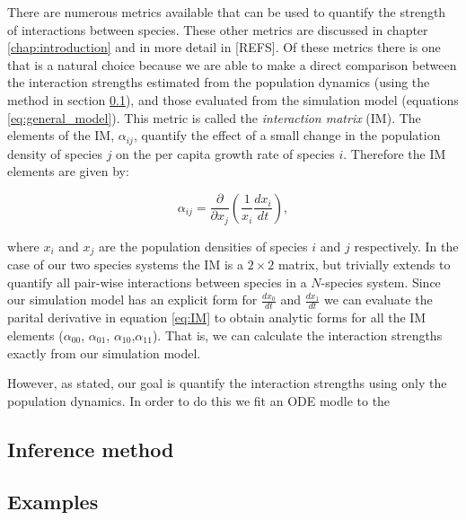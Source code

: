 There are numerous metrics available that can be used to quantify the strength of interactions between species. These other metrics are discussed in chapter \ref{chap:introduction} and in more detail in [REFS]. Of these metrics there is one that is a natural choice because we are able to make a direct comparison between the interaction strengths estimated from the population dynamics (using the method in section \ref{sec:timme}), and those evaluated from the simulation model (equations \ref{eq:general_model}). This metric is called the \emph{interaction matrix} (IM). The elements of the IM, $\alpha_{ij}$, quantify the effect of a small change in the population density of species $j$ on the per capita growth rate of species $i$. Therefore the IM elements are given by:

\begin{equation}
\alpha_{ij} = \frac{\partial}{\partial x_{j}}\left(\frac{1}{x_{i}} \frac{dx_i}{dt} \right),
\label{eq:IM}
\end{equation}

where $x_i$ and $x_j$ are the population densities of species $i$ and $j$ respectively. In the case of our two species systems the IM is a $2 \times 2$ matrix, but trivially extends to quantify all pair-wise interactions between species in a $N$-species system. Since our simulation model has an explicit form for $\frac{dx_0}{dt}$ and $\frac{dx_1}{dt}$ we can evaluate the parital derivative in equation \ref{eq:IM} to obtain analytic forms for all the IM elements ($\alpha_{00}$, $\alpha_{01}$, $\alpha_{10}$,$\alpha_{11}$). That is, we can calculate the interaction strengths exactly from our simulation model. 


However, as stated, our goal is quantify the interaction strengths using only the population dynamics. In order to do this we fit an ODE modle to the  

\subsection{Inference method}
\label{sec:timme}


\subsection{Examples}
\label{sec:method_examples}


